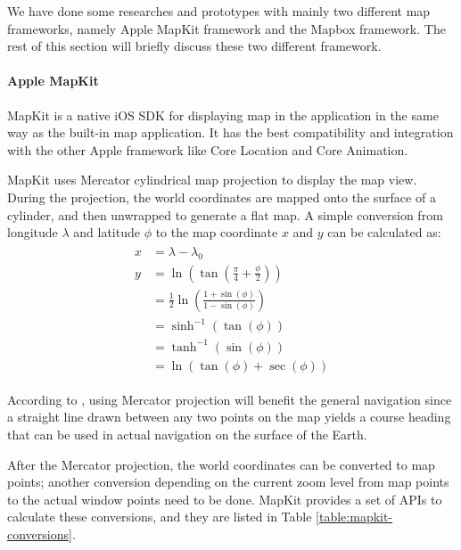 \documentclass[12pt,a4paper]{article}
\begin{document}
                We have done some researches and prototypes with mainly two different map frameworks, namely Apple MapKit framework and the Mapbox framework. The rest of this section will briefly discuss these two different framework.
                
                \paragraph{Apple MapKit}
                MapKit is a native iOS SDK for displaying map in the application in the same way as the built-in map application. It has the best compatibility and integration with the other Apple framework like Core Location and Core Animation. 
                
                MapKit uses Mercator cylindrical map projection to display the map view. During the projection, the world coordinates are mapped onto the surface of a cylinder, and then unwrapped to generate a flat map. A simple conversion from longitude $\lambda$ and latitude $\phi$ to the map coordinate $x$ and $y$ can be calculated as:
                \begin{align*}
                    \begin{split}
                        x&=\lambda-\lambda_0\\
                        y&=\ln(\tan(\frac{\pi}{4}+\frac{\phi}{2}))\\
                        &=\frac{1}{2}\ln(\frac{1+\sin(\phi)}{1-\sin(\phi)})\\
                        &=\sinh^{-1}(\tan(\phi))\\
                        &=\tanh^{-1}(\sin(\phi))\\
                        &=\ln(\tan(\phi)+\sec(\phi))
                    \end{split}
                \end{align*}
                
                According to \citet{AppleMapKitUnderstandingMapGeometry}, using Mercator projection will benefit the general navigation since a straight line drawn between any two points on the map yields a course heading that can be used in actual navigation on the surface of the Earth.
                
                After the Mercator projection, the world coordinates can be converted to map points; another conversion depending on the current zoom level from map points to the actual window points need to be done. MapKit provides a set of APIs to calculate these conversions, and they are listed in Table \ref{table:mapkit-conversions}.
                
\end{document}
